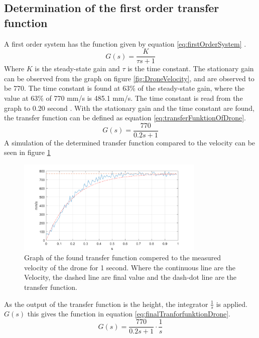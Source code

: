 \subsection*{Determination of the first order transfer function}
A first order system has the function given by equation \ref{eq:firstOrderSystem} \cite{Bolton2002}.
\begin{equation}\label{eq:firstOrderSystem}
    G(s)=\frac{K}{\tau s + 1}
\end{equation}
Where $K$ is the steady-state gain and $\tau$ is the time constant. 
The stationary gain can be observed from the graph on figure \ref{fig:DroneVelocity}, and are observed to be 770. 
The time constant is found at 63\% of the steady-state gain, where the value at 63\% of 770 mm/s is 485.1 mm/s. 
The time constant is read from the graph to 0.20 second \cite{Bolton2002}.
With the stationary gain and the time constant are found, the transfer function can be defined as equation \ref{eq:transferFunktionOfDrone}.
\begin{equation}\label{eq:transferFunktionOfDrone}
    G(s)=\frac{770}{0.2 s + 1}
\end{equation}
A simulation of the determined transfer function compared to the velocity can be seen in figure \ref{fig:Deter_transfor_function} 
\begin{figure}[h]
    \centering
    \includegraphics[width=0.8\textwidth]{figures/ch_movement/TransferFuntionDrone.png}
    \caption{Graph of the found transfer function compered to the measured velocity of the drone for 1 second. Where the continuous line are the Velocity, the dashed line are final value and the dash-dot line are the transfer function.}
    \label{fig:Deter_transfor_function}
\end{figure}
\newline
As the output of the transfer function is the height, the integrator $\frac{1}{s}$ is applied. $G(s)$ this gives the function in equation \ref{eq:finalTranforfunktionDrone}.
\begin{equation}\label{eq:finalTranforfunktionDrone}
    G(s) = \frac{770}{0.2 s+1}\cdot \frac{1}{s}
\end{equation}